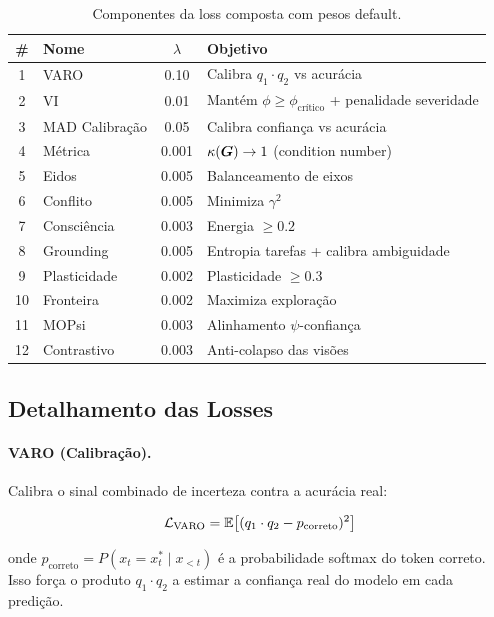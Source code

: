\begin{table}[H]
\centering
\caption{Componentes da loss composta com pesos default.}
\label{tab:losses}
\begin{tabular}{clcp{6cm}}
\toprule
\textbf{\#} & \textbf{Nome} & \textbf{$\lambda$} & \textbf{Objetivo} \\
\midrule
1 & VARO & 0.10 & Calibra $q_1 \cdot q_2$ vs acur\'acia \\
2 & VI & 0.01 & Mant\'em $\phi \geq \phi_{\text{cr\'itico}}$ + penalidade severidade \\
3 & MAD Calibra\c{c}\~ao & 0.05 & Calibra confian\c{c}a vs acur\'acia \\
4 & M\'etrica & 0.001 & $\kappa(\bm{G}) \to 1$ (condition number) \\
5 & Eidos & 0.005 & Balanceamento de eixos \\
6 & Conflito & 0.005 & Minimiza $\gamma^2$ \\
7 & Consci\^encia & 0.003 & Energia $\geq 0.2$ \\
8 & Grounding & 0.005 & Entropia tarefas + calibra ambiguidade \\
9 & Plasticidade & 0.002 & Plasticidade $\geq 0.3$ \\
10 & Fronteira & 0.002 & Maximiza explora\c{c}\~ao \\
11 & MOPsi & 0.003 & Alinhamento $\psi$-confian\c{c}a \\
12 & Contrastivo & 0.003 & Anti-colapso das vis\~oes \\
\bottomrule
\end{tabular}
\end{table}

\subsection{Detalhamento das Losses}

\paragraph{VARO (Calibra\c{c}\~ao).}
Calibra o sinal combinado de incerteza contra a acur\'acia real:

\begin{equation}
    \mathcal{L}_{\text{VARO}} = \mathbb{E}\big[(q_1 \cdot q_2 - p_{\text{correto}})^2\big]
\end{equation}

onde $p_{\text{correto}} = P(x_t = x_t^* \mid x_{<t})$ \'e a probabilidade
softmax do token correto. Isso for\c{c}a o produto $q_1 \cdot q_2$ a estimar
a confian\c{c}a real do modelo em cada predi\c{c}\~ao.

